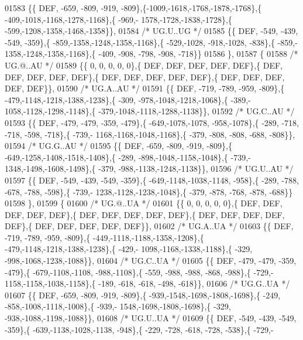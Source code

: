 \begin{DoxyCode}
01583 \{\{  DEF, -659, -809, -919, -809\},\{-1009,-1618,-1768,-1878,-1768\},\{ -409,-1018,-1168,-1278,-1168\},\{ -969,-
      1578,-1728,-1838,-1728\},\{ -599,-1208,-1358,-1468,-1358\}\},
01584 \textcolor{comment}{/* UG.U..UG */}
01585 \{\{  DEF, -549, -439, -549, -359\},\{ -859,-1358,-1248,-1358,-1168\},\{ -529,-1028, -918,-1028, -838\},\{ -859,-
      1358,-1248,-1358,-1168\},\{ -409, -908, -798, -908, -718\}\}
01586 \},
01587 \{
01588 \textcolor{comment}{/* UG.@..AU */}
01589 \{\{    0,    0,    0,    0,    0\},\{  DEF,  DEF,  DEF,  DEF,  DEF\},\{  DEF,  DEF,  DEF,  DEF,  DEF\},\{  DEF,  
      DEF,  DEF,  DEF,  DEF\},\{  DEF,  DEF,  DEF,  DEF,  DEF\}\},
01590 \textcolor{comment}{/* UG.A..AU */}
01591 \{\{  DEF, -719, -789, -959, -809\},\{ -479,-1148,-1218,-1388,-1238\},\{ -309, -978,-1048,-1218,-1068\},\{ -389,-
      1058,-1128,-1298,-1148\},\{ -379,-1048,-1118,-1288,-1138\}\},
01592 \textcolor{comment}{/* UG.C..AU */}
01593 \{\{  DEF, -479, -479, -359, -479\},\{ -649,-1078,-1078, -958,-1078\},\{ -289, -718, -718, -598, -718\},\{ -739,-
      1168,-1168,-1048,-1168\},\{ -379, -808, -808, -688, -808\}\},
01594 \textcolor{comment}{/* UG.G..AU */}
01595 \{\{  DEF, -659, -809, -919, -809\},\{ -649,-1258,-1408,-1518,-1408\},\{ -289, -898,-1048,-1158,-1048\},\{ -739,-
      1348,-1498,-1608,-1498\},\{ -379, -988,-1138,-1248,-1138\}\},
01596 \textcolor{comment}{/* UG.U..AU */}
01597 \{\{  DEF, -549, -439, -549, -359\},\{ -649,-1148,-1038,-1148, -958\},\{ -289, -788, -678, -788, -598\},\{ -739,-
      1238,-1128,-1238,-1048\},\{ -379, -878, -768, -878, -688\}\}
01598 \},
01599 \{
01600 \textcolor{comment}{/* UG.@..UA */}
01601 \{\{    0,    0,    0,    0,    0\},\{  DEF,  DEF,  DEF,  DEF,  DEF\},\{  DEF,  DEF,  DEF,  DEF,  DEF\},\{  DEF,  
      DEF,  DEF,  DEF,  DEF\},\{  DEF,  DEF,  DEF,  DEF,  DEF\}\},
01602 \textcolor{comment}{/* UG.A..UA */}
01603 \{\{  DEF, -719, -789, -959, -809\},\{ -449,-1118,-1188,-1358,-1208\},\{ -479,-1148,-1218,-1388,-1238\},\{ -429,-
      1098,-1168,-1338,-1188\},\{ -329, -998,-1068,-1238,-1088\}\},
01604 \textcolor{comment}{/* UG.C..UA */}
01605 \{\{  DEF, -479, -479, -359, -479\},\{ -679,-1108,-1108, -988,-1108\},\{ -559, -988, -988, -868, -988\},\{ -729,-
      1158,-1158,-1038,-1158\},\{ -189, -618, -618, -498, -618\}\},
01606 \textcolor{comment}{/* UG.G..UA */}
01607 \{\{  DEF, -659, -809, -919, -809\},\{ -939,-1548,-1698,-1808,-1698\},\{ -249, -858,-1008,-1118,-1008\},\{ -939,-
      1548,-1698,-1808,-1698\},\{ -329, -938,-1088,-1198,-1088\}\},
01608 \textcolor{comment}{/* UG.U..UA */}
01609 \{\{  DEF, -549, -439, -549, -359\},\{ -639,-1138,-1028,-1138, -948\},\{ -229, -728, -618, -728, -538\},\{ -729,-

\end{DoxyCode}
